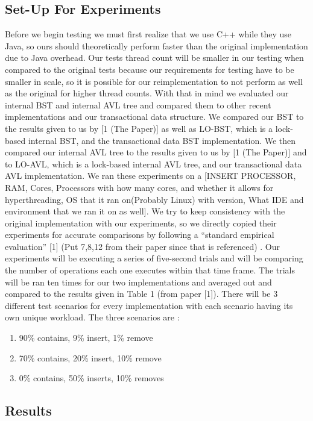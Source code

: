 \documentclass[conference]{IEEEtran}
\begin{document}
\subsection{Set-Up For Experiments}
Before we begin testing we must first realize that we use C++ while they use Java, so ours should theoretically perform faster than the original implementation due to Java overhead. Our tests thread count will be smaller in our testing when compared to the original tests because our requirements for testing have to be smaller in scale, so it is possible for our reimplementation to not perform as well as the original for higher thread counts. With that in mind we evaluated our internal BST and internal AVL tree and compared them to other recent implementations and our transactional data structure. We compared our BST to the results given to us by [1 (The Paper)] as well as LO-BST, which is a lock-based internal BST, and the transactional data BST implementation. We then compared our internal AVL tree to the results given to us by [1 (The Paper)] and to LO-AVL, which is a lock-based internal AVL tree, and our transactional data AVL implementation. 
We ran these experiments on a [INSERT PROCESSOR, RAM, Cores, Processors with how many cores, and whether it allows for hyperthreading, OS that it ran on(Probably Linux) with version, What IDE and environment that we ran it on as well].
We try to keep consistency with the original implementation with our experiments, so we directly copied their experiments for accurate comparisons by following a “standard empirical evaluation” [1] (Put 7,8,12 from their paper since that is referenced) . Our experiments will be executing a series of five-second trials and will be comparing the number of operations each one executes within that time frame. The trials will be ran ten times for our two implementations and averaged out and compared to the results given in Table 1 (from paper [1]). There will be 3 different test scenarios for every implementation with each scenario having its own unique workload. The three scenarios are : 
\begin{enumerate}[label=(\roman*)]
	\item 90\% contains, 9\% insert, 1\% remove
	\item 70\% contains, 20\% insert, 10\% remove
	\item 0\% contains, 50\% inserts, 10\% removes
\end{enumerate}


\subsection{Results}
\end{document}
